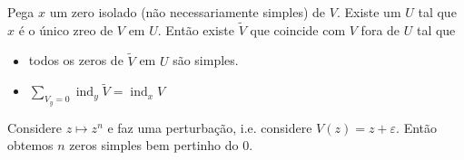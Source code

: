 \begin{exercise}\leavevmode
Pega \(x\) um zero isolado (não necessariamente simples) de \(V\). Existe um \(U\) tal que \(x\) é o único zreo de \(V\) em \(U\). Então existe \(\tilde{V}\) que coincide com \(V\) fora de \(U\) tal que 
\begin{itemize}
\item todos os zeros de \(\tilde{V}\) em \(U\) são simples.
\item \(\sum_{V_y=0}\operatorname{ind}_y \tilde{V}=\operatorname{ind}_xV\)
\end{itemize}
\end{exercise}

\begin{example}\leavevmode
Considere \(z \mapsto  z^n\) e faz uma perturbação, i.e. considere \(V(z)=z+\varepsilon\). Então obtemos \(n\) zeros simples bem pertinho do 0.
\end{example}

